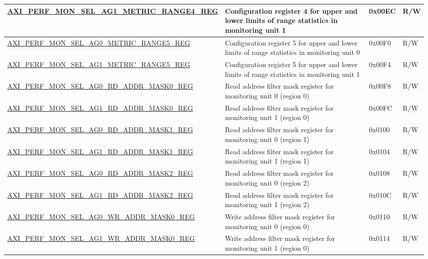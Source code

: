 \begin{longtable}{ | p{9.1cm} | p{5cm} | p{1.3cm} | p{1.4cm} | }
\hyperref[regdesc:AXIPERFMONSELAGNMETRICRANGEMREG]{AXI\_PERF\_MON\_SEL\_AG1\_METRIC\_RANGE4\_REG} & Configuration register 4 for upper and lower limits of range statistics in monitoring unit 1 & 0x00EC & R/W\\ \hline
\hyperref[regdesc:AXIPERFMONSELAGNMETRICRANGEMREG]{AXI\_PERF\_MON\_SEL\_AG0\_METRIC\_RANGE5\_REG} & Configuration register 5 for upper and lower limits of range statistics in monitoring unit 0 & 0x00F0 & R/W\\ \hline
\hyperref[regdesc:AXIPERFMONSELAGNMETRICRANGEMREG]{AXI\_PERF\_MON\_SEL\_AG1\_METRIC\_RANGE5\_REG} & Configuration register 5 for upper and lower limits of range statistics in monitoring unit 1 & 0x00F4 & R/W\\ \hline
\hyperref[regdesc:AXIPERFMONSELAGNRDADDRMASKMREG]{AXI\_PERF\_MON\_SEL\_AG0\_RD\_ADDR\_MASK0\_REG} & Read address filter mask register for monitoring unit 0 (region 0) & 0x00F8 & R/W\\ \hline
\hyperref[regdesc:AXIPERFMONSELAGNRDADDRMASKMREG]{AXI\_PERF\_MON\_SEL\_AG1\_RD\_ADDR\_MASK0\_REG} & Read address filter mask register for monitoring unit 1 (region 0) & 0x00FC & R/W\\ \hline
\hyperref[regdesc:AXIPERFMONSELAGNRDADDRMASKMREG]{AXI\_PERF\_MON\_SEL\_AG0\_RD\_ADDR\_MASK1\_REG} & Read address filter mask register for monitoring unit 0 (region 1) & 0x0100 & R/W\\ \hline
\hyperref[regdesc:AXIPERFMONSELAGNRDADDRMASKMREG]{AXI\_PERF\_MON\_SEL\_AG1\_RD\_ADDR\_MASK1\_REG} & Read address filter mask register for monitoring unit 1 (region 1) & 0x0104 & R/W\\ \hline
\hyperref[regdesc:AXIPERFMONSELAGNRDADDRMASKMREG]{AXI\_PERF\_MON\_SEL\_AG0\_RD\_ADDR\_MASK2\_REG} & Read address filter mask register for monitoring unit 0 (region 2) & 0x0108 & R/W\\ \hline
\hyperref[regdesc:AXIPERFMONSELAGNRDADDRMASKMREG]{AXI\_PERF\_MON\_SEL\_AG1\_RD\_ADDR\_MASK2\_REG} & Read address filter mask register for monitoring unit 1 (region 2) & 0x010C & R/W\\ \hline
\hyperref[regdesc:AXIPERFMONSELAGNWRADDRMASKMREG]{AXI\_PERF\_MON\_SEL\_AG0\_WR\_ADDR\_MASK0\_REG} & Write address filter mask register for monitoring unit 0 (region 0) & 0x0110 & R/W\\ \hline
\hyperref[regdesc:AXIPERFMONSELAGNWRADDRMASKMREG]{AXI\_PERF\_MON\_SEL\_AG1\_WR\_ADDR\_MASK0\_REG} & Write address filter mask register for monitoring unit 1 (region 0) & 0x0114 & R/W\\ \hline

\end{longtable}

